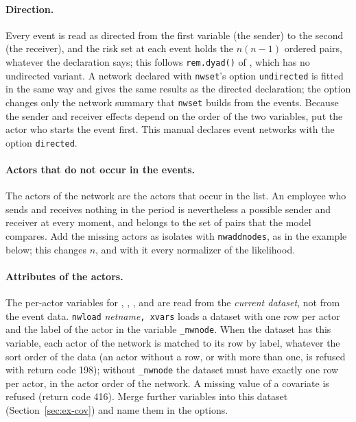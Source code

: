 \paragraph{Direction.} Every event is read as directed from the first variable (the sender) to the second (the receiver), and the risk set at each event holds the $n(n-1)$ ordered pairs, whatever the declaration says; this follows \texttt{rem.dyad()} of \relevent{}, which has no undirected variant. A network declared with \texttt{nwset}'s option \texttt{undirected} is fitted in the same way and gives the same results as the directed declaration; the option changes only the network summary that \texttt{nwset} builds from the events. Because the sender and receiver effects depend on the order of the two variables, put the actor who starts the event first. This manual declares event networks with the option \texttt{directed}.

\paragraph{Actors that do not occur in the events.} The actors of the network are the actors that occur in the list. An employee who sends and receives nothing in the period is nevertheless a possible sender and receiver at every moment, and belongs to the set of pairs that the model compares. Add the missing actors as isolates with \texttt{nwaddnodes}, as in the example below; this changes $n$, and with it every normalizer of the likelihood.

\paragraph{Attributes of the actors.} The per-actor variables for , , ,  and  are read from the \emph{current dataset}, not from the event data. \texttt{nwload} \emph{netname}\texttt{, xvars} loads a dataset with one row per actor and the label of the actor in the variable \texttt{\_nwnode}. When the dataset has this variable, each actor of the network is matched to its row by label, whatever the sort order of the data (an actor without a row, or with more than one, is refused with return code 198); without \texttt{\_nwnode} the dataset must have exactly one row per actor, in the actor order of the network. A missing value of a covariate is refused (return code 416). Merge further variables into this dataset (Section~\ref{sec:ex-cov}) and name them in the options.


